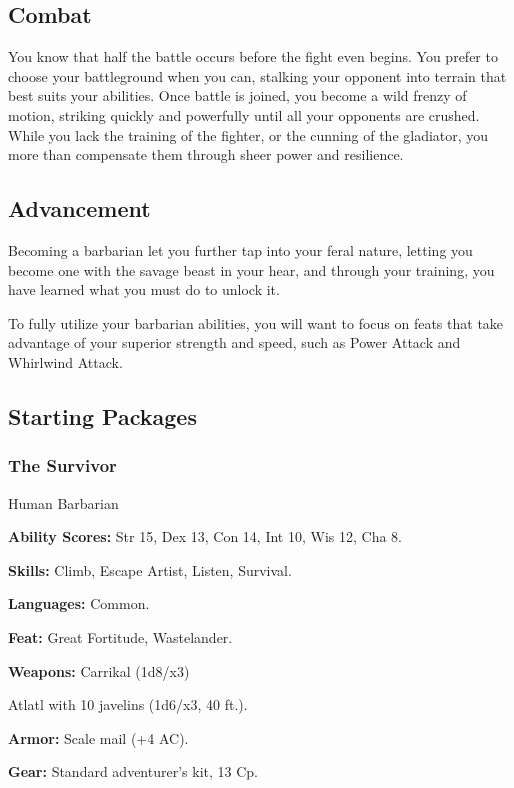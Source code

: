 \documentclass[10pt,a4paper,twocolumn]{d20}
\begin{document}
{\subsection{Combat}

You know that half the battle occurs before the fight even begins. You prefer to choose your battleground when you can, stalking your opponent into terrain that best suits your abilities. Once battle is joined, you become a wild frenzy of motion, striking quickly and powerfully until all your opponents are crushed. While you lack the training of the fighter, or the cunning of the gladiator, you more than compensate them through sheer power and resilience.

\subsection{Advancement}

Becoming a barbarian let you further tap into your feral nature, letting you become one with the savage beast in your hear, and through your training, you have learned what you must do to unlock it.

To fully utilize your barbarian abilities, you will want to focus on feats that take advantage of your superior strength and speed, such as Power Attack and Whirlwind Attack.

\subsection{Starting Packages}

\subsubsection{The Survivor}

Human Barbarian

\textbf{Ability Scores:} Str 15, Dex 13, Con 14, Int 10, Wis 12, Cha 8.

\textbf{Skills:} Climb, Escape Artist, Listen, Survival.

\textbf{Languages:} Common.

\textbf{Feat:} Great Fortitude, Wastelander.

\textbf{Weapons:} Carrikal (1d8/x3)

Atlatl with 10 javelins (1d6/x3, 40 ft.).

\textbf{Armor:} Scale mail (+4 AC).

\textbf{Gear:} Standard adventurer’s kit, 13 Cp.

}
\end{document}
